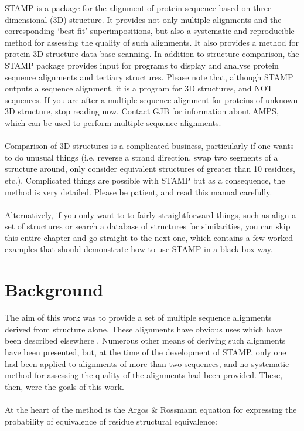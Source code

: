 STAMP is a package for the alignment of protein sequence based on
three--dimensional (3D) structure.  It provides not only multiple
alignments and the corresponding `best-fit' superimpositions, but
also a systematic and reproducible method for assessing the
quality of such alignments.  It also provides a method for protein
3D structure data base scanning.  In addition to structure
comparison, the STAMP package provides input for programs to
display and analyse protein sequence alignments and tertiary structures.
Please note that, although STAMP outputs a sequence alignment, it is 
a program for 3D structures, and NOT sequences.  If 
you are after a multiple sequence alignment for proteins of unknown 3D 
structure, stop reading now.  Contact GJB for information
about AMPS, which can be used to perform multiple sequence
alignments.\\
\\
Comparison of 3D structures is a complicated
business, particularly if one wants to do unusual things (i.e.
reverse a strand direction, swap two segments of a structure
around, only consider equivalent structures of greater
than 10 residues, etc.).  Complicated things are possible with STAMP but
as a consequence, the method is very detailed.  Please be patient, and 
read this manual carefully.\\
\\
Alternatively, if you only want to to fairly straightforward things, such
as align a set of structures or search a database of structures for
similarities, you can skip this entire chapter and go straight to the
next one, which contains a few worked examples that should demonstrate how
to use STAMP in a black-box way.

\section{Background}

The aim of this work was to provide a set of multiple sequence
alignments derived from structure alone.  These alignments have 
obvious uses which have been described elsewhere \cite{rb92b,sali90}.  
Numerous other means of deriving such alignments have been 
presented, but, at the time of the development of STAMP, only one had
been applied to alignments of more than two sequences, and no 
systematic method for assessing the quality of the alignments had 
been provided.  These, then, were the goals of this work.\\
\\
At the heart of the method is the Argos \& Rossmann \cite{argos76}
equation for expressing the probability of equivalence of
residue structural equivalence:\\

